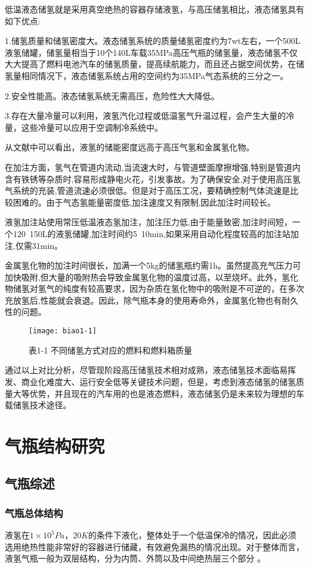 \documentclass[UTF8,a4paper]{ctexart}
\newcommand{\upcite}[1]{\textsuperscript{\textsuperscript{\cite{#1}}}}
\begin{document}
	低温液态储氢就是采用真空绝热的容器存储液氢，与高压储氢相比，液态储氢具有如下优点:
	
	1.储氢质量和储氢密度大。液态储氢系统的质量储氢密度约为7wt左右，一个500L液氢储罐，储氢量相当于10个140L车载35MPa高压气瓶的储氢量，液态储氢不仅大大提高了燃料电池汽车的储氢质量，提高续航能力，而且还占据空间优势，在储氢量相同情况下，液态储氢系统占用的空间约为35MPa气态系统的三分之一。
	
	2.安全性能高。液态储氢系统无需高压，危险性大大降低。
	
	3.存在大量冷量可以利用，液氢汽化过程或低温氢气升温过程，会产生大量的冷量，这些冷量可以应用于空调制冷系统中。
	
	从文献\upcite{ref1}中可以看出，液氢的储能密度远高于高压气氢和金属氢化物。
	
	在加注方面，氢气在管道内流动,当流速大时，与管道壁面摩擦增强,特别是管道内含有铁锈等杂质时,容易形成静电火花，引发事故。为了确保安全,对于使用高压氢气系统的充装,管道流速必须很低。但是对于高压工况，要精确控制气体流速是比较困难的。由于气态氢能量密度低,加注速度又有限制,因此加注时间较长。
	
	液氢加注站使用常压低温液态氢加注，加注压力低,由于能量致密,加注时间短，一个120~150L的液氢储罐,加注时间约5~10min,如果采用自动化程度较高的加注站加注,仅需31min。
	
	金属氢化物的加注时间很长，加满一个5kg的储氢瓶约需1h。虽然提高充气压力可加快吸附,但大量的吸附热会导致金属氢化物的温度过高，以至烧坏。此外，氢化物储氢对氢气的纯度有较高要求，因为杂质在氢化物中的吸附是不可逆的，在多次充放氢后,性能就会衰退。因此，除气瓶本身的使用寿命外，金属氢化物也有耐久性的问题。
	
	\begin{figure}[H]
		\centering
		\texttt{[image: biao1-1]}
		\caption*{表1-1 不同储氢方式对应的燃料和燃料箱质量}
		\label{fig:biao1-1}
	\end{figure}
	通过以上对比分析，尽管现阶段高压储氢技术相对成熟，液态储氢技术面临易挥发、商业化难度大、运行安全低等关键技术问题，但是，考虑到液态储氢的储氢质量大等优势，并且现在的汽车用的也是液态燃料，液态储氢仍是未来较为理想的车载储氢技术途径。
	\section{气瓶结构研究}
	\subsection{气瓶综述}
	\subsubsection{气瓶总体结构}
	液氢在$1\times10^{5}Pa$，$20K$的条件下液化，整体处于一个低温保冷的情况，因此必须选用绝热性能非常好的容器进行储藏，有效避免漏热的情况出现。对于整体而言，液氢气瓶一般为双层结构，分为内筒、外筒以及中间绝热层三个部分 \upcite{ref2}。
	
\end{document}

